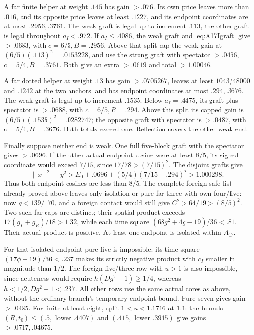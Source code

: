 \documentclass[11pt]{article}
\theoremstyle{definition}
\theoremstyle{remark}
\newcommand{\norm}[1]{\lVert #1\rVert}
\begin{document}
A far finite helper at weight \(.145\) has gain \(>.076\).
Its own price leaves more than \(.016\), and its opposite price
leaves at least \(.1227\),
and its endpoint coordinates are at most \(.2956,.3761\).
The weak graft is legal up to increment \(.113\); the other
graft is legal throughout \(a_I<.972\). If \(a_I\le.4086\),
the weak graft and \eqref{eq:A17Igraft} give \(>.0683\),
with \(c=6/5,B=.2956\). Above that split cap the weak gain
at \((6/5)(.113)^2=.0153228\), and use the strong graft
with spectator \(>.0466\), \(c=5/4,B=.3761\).
Both give an extra \(>.0619\) and total \(>1.00046\).

A far dotted helper at weight \(.13\) has gain \(>.0705267\),
leaves at least \(1043/48000\) and \(.1242\) at the two anchors,
and has endpoint coordinates at most \(.294,.3676\).
The weak graft is legal up to increment \(.1535\).
Below \(a_I=.4475\), its graft plus spectator is \(>.0688\),
with \(c=6/5,B=.294\). Above this split its capped gain is
\((6/5)(.1535)^2=.0282747\); the opposite graft with spectator
is \(>.0487\), with \(c=5/4,B=.3676\).
Both totals exceed one. Reflection covers the other weak end.

Finally suppose neither end is weak. One full five-block graft with
the spectator gives \(>.0696\). If the other actual endpoint
cosine were at least \(8/5\), its signed coordinate would exceed
\(7/15\), since \(17/78>(7/15)^2\). The disjoint grafts give
\[
 \norm x^2+y^2>E_0+.0696+(5/4)(7/15-.294)^2>1.000298.
\]
Thus both endpoint cosines are less than \(8/5\). The complete
foreign-safe list already proved above leaves only isolation or pure
far-three with own four/five: now \(g<139/170\), and a foreign
contact would still give \(C^2>64/19>(8/5)^2\).
Two such far caps are distinct; their spatial product exceeds
\(17(g_L+g_R)/18>1.32\), while each time square
\((68g^2+4g-19)/36<.81\). Their actual product is positive.
At least one endpoint is isolated within \(A_{17}\).

For that isolated endpoint pure five is impossible: its time square
\((17\phi-19)/36<.237\) makes its strictly negative product with
\(c_I\) smaller in magnitude than \(1/2\). The foreign
five/three row with \(u>1\) is also impossible, since acuteness
would require \(h(Dg^2-1)\ge1/4\), whereas
\(h<1/2,Dg^2-1<.237\). All other rows use the same actual cores
as above, without the ordinary branch's temporary endpoint bound.
Pure seven gives gain \(>.0485\). For finite at least eight,
split \(1<u<1.1716\) at \(1.1\): the bounds
\((R,t_0)\le(.5,\text{ lower } .4407)\) and
\((.415,\text{ lower } .3945)\) give gains \(>.0717,.04675\).
\end{document}

